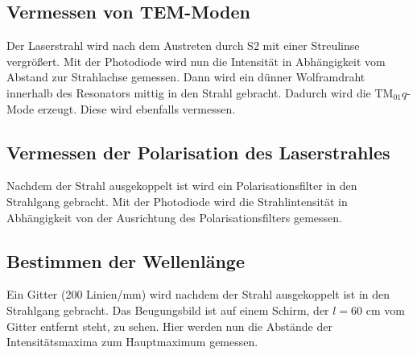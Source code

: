 \subsection{Vermessen von TEM-Moden}
Der Laserstrahl wird nach dem Austreten durch S2 mit einer Streulinse vergrößert. Mit der Photodiode wird nun die Intensität in Abhängigkeit vom 
Abstand zur Strahlachse gemessen. Dann wird ein dünner Wolframdraht innerhalb des Resonators mittig in den Strahl gebracht. Dadurch wird die TM$_01q$-Mode 
erzeugt. Diese wird ebenfalls vermessen.
\subsection{Vermessen der Polarisation des Laserstrahles}
Nachdem der Strahl ausgekoppelt ist wird ein Polarisationsfilter in den 
Strahlgang gebracht. Mit der Photodiode wird die Strahlintensität in 
Abhängigkeit von der Ausrichtung des Polarisationsfilters gemessen.
\subsection{Bestimmen der Wellenlänge}
Ein Gitter (200 Linien/mm) wird nachdem der Strahl ausgekoppelt ist in den 
Strahlgang gebracht. Das Beugungsbild ist auf einem Schirm, der $l=60\text{ 
cm}$ vom Gitter entfernt steht, zu sehen. Hier werden nun die Abstände der 
Intensitätsmaxima zum Hauptmaximum gemessen.